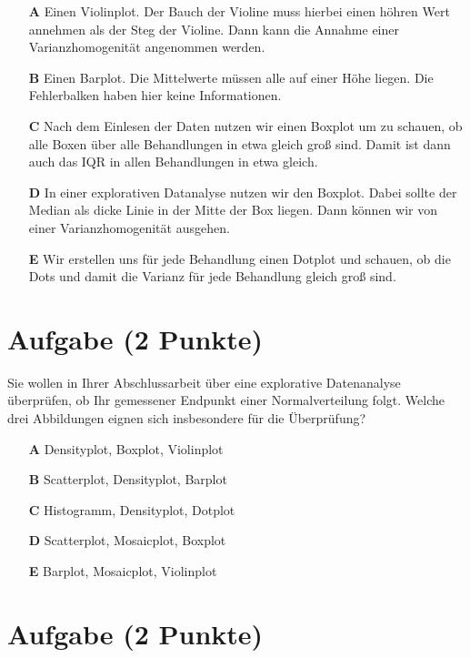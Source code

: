 \documentclass[a4paper, 9pt]{scrartcl}\usepackage[]{graphicx}\usepackage[]{xcolor}
\begin{document}
\begin{enumerate}
\item [\textbf{A} \msquare] Einen Violinplot. Der Bauch der Violine muss hierbei einen höhren Wert annehmen als der Steg der Violine. Dann kann die Annahme einer Varianzhomogenität angenommen werden.
\item [\textbf{B} \msquare] Einen Barplot. Die Mittelwerte müssen alle auf einer Höhe liegen. Die Fehlerbalken haben hier keine Informationen.
\item [\textbf{C} \msquare] Nach dem Einlesen der Daten nutzen wir einen Boxplot um zu schauen, ob alle Boxen über alle Behandlungen in etwa gleich groß sind. Damit ist dann auch das IQR in allen Behandlungen in etwa gleich.
\item [\textbf{D} \msquare] In einer explorativen Datanalyse nutzen wir den Boxplot. Dabei sollte der Median als dicke Linie in der Mitte der Box liegen. Dann können wir von einer Varianzhomogenität ausgehen.
\item [\textbf{E} \msquare] Wir erstellen uns für jede Behandlung einen Dotplot und schauen, ob die Dots und damit die Varianz für jede Behandlung gleich groß sind.
\end{enumerate}

\section{Aufgabe \hfill (2 Punkte)}




Sie wollen in Ihrer Abschlussarbeit über eine explorative Datenanalyse überprüfen, ob Ihr gemessener Endpunkt einer Normalverteilung folgt. Welche drei Abbildungen eignen sich insbesondere für die Überprüfung?





\begin{enumerate}
\item [\textbf{A} \msquare] Densityplot, Boxplot, Violinplot
\item [\textbf{B} \msquare] Scatterplot, Densityplot, Barplot
\item [\textbf{C} \msquare] Histogramm, Densityplot, Dotplot
\item [\textbf{D} \msquare] Scatterplot, Mosaicplot, Boxplot
\item [\textbf{E} \msquare] Barplot, Mosaicplot, Violinplot
\end{enumerate} 

\section{Aufgabe \hfill (2 Punkte)}
\end{document}
